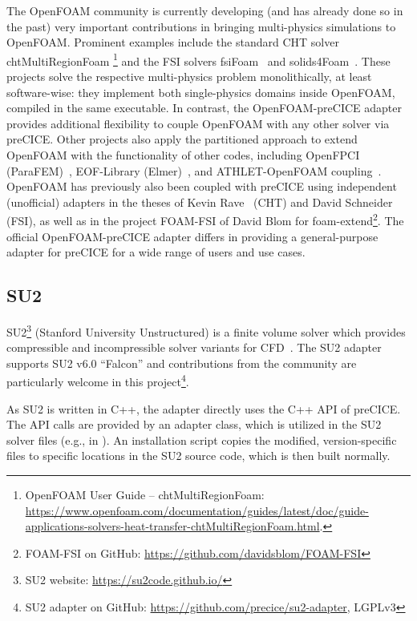 The OpenFOAM community is currently developing (and has already done so in the past) very important contributions in bringing multi-physics
simulations to OpenFOAM. Prominent examples include the standard CHT solver chtMultiRegionFoam
\footnote{OpenFOAM User Guide -- chtMultiRegionFoam: \url{https://www.openfoam.com/documentation/guides/latest/doc/guide-applications-solvers-heat-transfer-chtMultiRegionFoam.html}.}
and the FSI solvers fsiFoam~\cite{Tukovic2018_fsiFoam} and solids4Foam~\cite{Cardiff2018_solids4Foam}.
These projects solve the respective multi-physics problem monolithically, at least software-wise: they implement both single-physics domains inside OpenFOAM, compiled in the same executable.
In contrast, the OpenFOAM-preCICE adapter provides additional flexibility to couple OpenFOAM with any other solver via preCICE.
Other projects also apply the partitioned approach to extend OpenFOAM with the functionality of other codes, including
OpenFPCI (ParaFEM)~\cite{Hewitt2019_OpenFPCI},
EOF-Library (Elmer)~\cite{Vencels2019_EOF}, and ATHLET-OpenFOAM coupling~\cite{Herb2014_ATHLET}.
OpenFOAM has previously also been coupled with preCICE using independent (unofficial) adapters in the theses of Kevin Rave~\cite{Rave2017_thesis} (CHT) and David Schneider~\cite{Schneider2018_thesis} (FSI),
as well as in the project FOAM-FSI of David Blom for foam-extend\footnote{FOAM-FSI on GitHub: \url{https://github.com/davidsblom/FOAM-FSI}}.
The official OpenFOAM-preCICE adapter differs in providing a general-purpose adapter for preCICE for a wide range of users and use cases.

 
\subsection{SU2} 

SU2\footnote{SU2 website: \url{https://su2code.github.io/}} (Stanford University Unstructured) is a finite volume solver which provides compressible and incompressible solver variants for CFD~\cite{SU2-paper}. The SU2 adapter~\cite{AlexRusch2016} supports SU2 v6.0 ``Falcon'' and contributions from the community are particularly welcome in this project\footnote{SU2 adapter on GitHub: \url{https://github.com/precice/su2-adapter}, LGPLv3}.

As SU2 is written in C++, the adapter directly uses the C++ API of preCICE. The API calls are provided by an adapter class, which is utilized in the SU2 solver files (e.g., in ). An installation script copies the modified, version-specific files to specific locations in the SU2 source code, which is then built normally.

